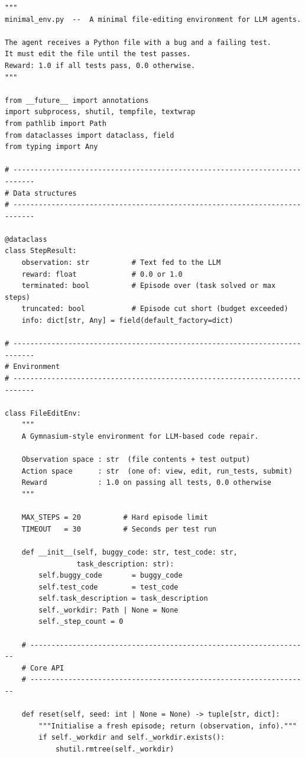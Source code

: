 \begin{lstlisting}[style=pythonstyle, caption={Minimal LLM agent environment following the Gymnasium API.}]
"""
minimal_env.py  --  A minimal file-editing environment for LLM agents.

The agent receives a Python file with a bug and a failing test.
It must edit the file until the test passes.
Reward: 1.0 if all tests pass, 0.0 otherwise.
"""

from __future__ import annotations
import subprocess, shutil, tempfile, textwrap
from pathlib import Path
from dataclasses import dataclass, field
from typing import Any

# ---------------------------------------------------------------------------
# Data structures
# ---------------------------------------------------------------------------

@dataclass
class StepResult:
    observation: str          # Text fed to the LLM
    reward: float             # 0.0 or 1.0
    terminated: bool          # Episode over (task solved or max steps)
    truncated: bool           # Episode cut short (budget exceeded)
    info: dict[str, Any] = field(default_factory=dict)

# ---------------------------------------------------------------------------
# Environment
# ---------------------------------------------------------------------------

class FileEditEnv:
    """
    A Gymnasium-style environment for LLM-based code repair.

    Observation space : str  (file contents + test output)
    Action space      : str  (one of: view, edit, run_tests, submit)
    Reward            : 1.0 on passing all tests, 0.0 otherwise
    """

    MAX_STEPS = 20          # Hard episode limit
    TIMEOUT   = 30          # Seconds per test run

    def __init__(self, buggy_code: str, test_code: str,
                 task_description: str):
        self.buggy_code       = buggy_code
        self.test_code        = test_code
        self.task_description = task_description
        self._workdir: Path | None = None
        self._step_count = 0

    # ------------------------------------------------------------------
    # Core API
    # ------------------------------------------------------------------

    def reset(self, seed: int | None = None) -> tuple[str, dict]:
        """Initialise a fresh episode; return (observation, info)."""
        if self._workdir and self._workdir.exists():
            shutil.rmtree(self._workdir)


\end{lstlisting}
